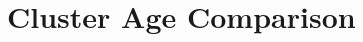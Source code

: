 \documentclass[11pt,twocolumn,tighten]{aastex63}
\newcommand{\nkeplerstars}{$\approx$160{,}000}
\begin{document}
%
%
%




\section{Cluster Age Comparison}
\label{sec:litagecomparison}
\end{document}
